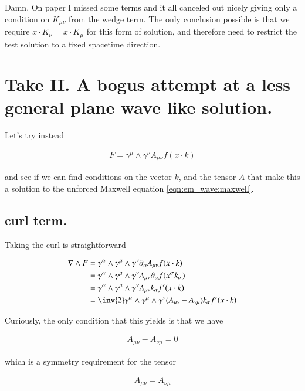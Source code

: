 Damn.  On paper I missed some terms and it all canceled out nicely giving only a condition on $K_{\mu\nu}$ from the wedge term.  The only
conclusion possible is that we require $x \cdot K_\nu = x \cdot K_\mu$ for this form of solution, and therefore need to restrict the
test solution to a fixed spacetime direction.

\section{Take II.  A bogus attempt at a less general plane wave like solution. }

Let's try instead

\begin{align}\label{eqn:em_wave:solutionTensor}
F = \gamma^\mu \wedge \gamma^\nu A_{\mu\nu} f( x \cdot k )
\end{align}

and see if we can find conditions on the vector $k$, and the tensor $A$ that make this a solution to the unforced Maxwell equation \ref{eqn:em_wave:maxwell}.

\subsection{curl term. }

Taking the curl is straightforward

\begin{align}
\grad \wedge F 
&= \gamma^\alpha \wedge \gamma^\mu \wedge \gamma^\nu \partial_\alpha A_{\mu\nu} f( x \cdot k ) \\
&= \gamma^\alpha \wedge \gamma^\mu \wedge \gamma^\nu A_{\mu\nu} \partial_\alpha f( x^\sigma k_\sigma ) \\
&= \gamma^\alpha \wedge \gamma^\mu \wedge \gamma^\nu A_{\mu\nu} k_\alpha f'( x \cdot k ) \\
&= \inv{2} \gamma^\alpha \wedge \gamma^\mu \wedge \gamma^\nu (A_{\mu\nu} - A_{\nu\mu} ) k_\alpha f'( x \cdot k ) \\
\end{align}

Curiously, the only condition that this yields is that we have

\begin{align*}
A_{\mu\nu} - A_{\nu\mu} = 0
\end{align*}

which is a symmetry requirement for the tensor

\begin{align*}
A_{\mu\nu} = A_{\nu\mu}
\end{align*}


